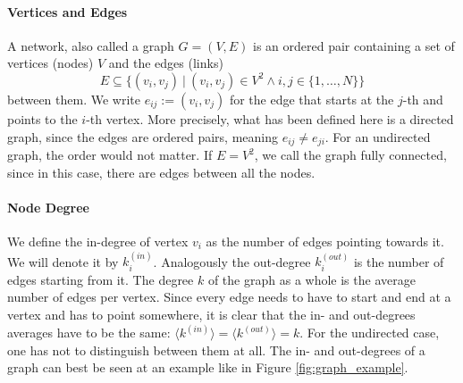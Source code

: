 \paragraph*{Vertices and Edges}
A network, also called a graph $G=(V,E)$ is an ordered pair containing a set of vertices (nodes) $V$ and the edges (links) 
\begin{equation}
E\subseteq\{(v_i,v_j)\ |\ (v_i,v_j)\in V^2 \wedge i,j\in\{1,\dots,N\}\}
\end{equation}
between them. We write $e_{ij}:=(v_i,v_j)$ for the edge that starts at the $j$-th and points to the $i$-th vertex. More precisely, what has been defined here is a directed graph, since the edges are ordered pairs, meaning $e_{ij}\neq e_{ji}$. For an undirected graph, the order would not matter. If $E = V^2$, we call the graph fully connected, since in this case, there are edges between all the nodes.

\paragraph*{Node Degree}
We define the in-degree of vertex $v_i$ as the number of edges pointing towards it. We will denote it by $k^{(in)}_i$. Analogously the out-degree $k^{(out)}_i$ is the number of edges starting from it. The degree $k$ of the graph as a whole is the average number of edges per vertex. Since every edge needs to have to start and end at a vertex and has to point somewhere, it is clear that the in- and out-degrees averages have to be the same: $\langle k^{(in)}\rangle=\langle k^{(out)}\rangle=k$. For the undirected case, one has not to distinguish between them at all. The in- and out-degrees of a graph can best be seen at an example like in Figure \ref{fig:graph_example}.

